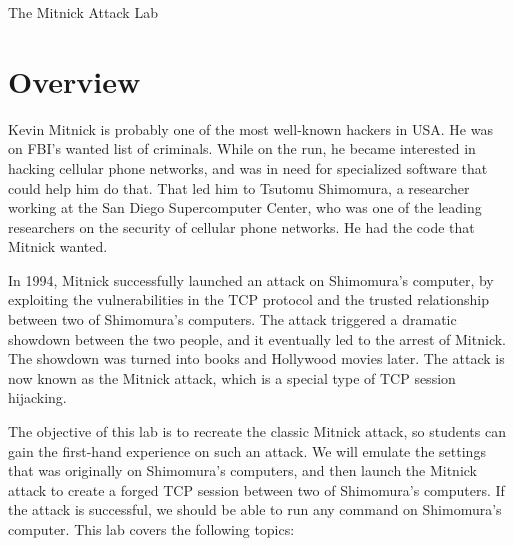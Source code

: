 




\newcommand{\mitnickFigs}{./Figs}

\newcommand{\rsh}{\texttt{rsh}\xspace}





\begin{center}
{\LARGE The Mitnick Attack Lab}
\end{center}



\section{Overview}

Kevin Mitnick is probably one of the most well-known hackers in USA. 
He was on FBI's wanted list of criminals. While on the run, 
he became interested in hacking cellular phone networks, and was in need for 
specialized software that could help him do that. 
That led him to Tsutomu Shimomura, a researcher working at 
the San Diego Supercomputer Center, who was
one of the leading researchers on the security of cellular phone networks.
He had the code that Mitnick wanted.

In 1994, Mitnick successfully launched an attack on Shimomura's computer,
by exploiting the vulnerabilities in the TCP protocol
and the trusted relationship between 
two of Shimomura's computers. The attack
triggered a dramatic showdown between the two people, and
it eventually led to the arrest of Mitnick. The showdown 
was turned into books and Hollywood movies later. 
The attack is now known as the Mitnick attack, which is a special type of
TCP session hijacking.


The objective of this lab is to recreate the classic Mitnick attack, 
so students can gain the first-hand experience on such an attack. 
We will emulate the settings that was originally on 
Shimomura's computers, and then 
launch the Mitnick attack to create a forged TCP session between
two of Shimomura's computers. If the attack is successful, 
we should be able to run any command on Shimomura's computer. 
This lab covers the following topics:

